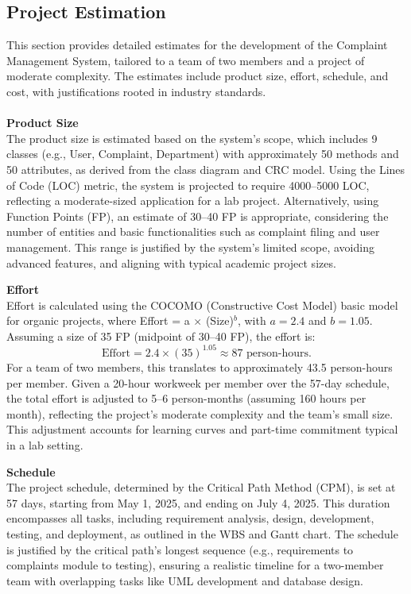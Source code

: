 \documentclass[a4paper,12pt]{article}
\begin{document}
\subsection{Project Estimation}
This section provides detailed estimates for the development of the Complaint Management System, tailored to a team of two members and a project of moderate complexity. The estimates include product size, effort, schedule, and cost, with justifications rooted in industry standards.
\\ \\ 
\textbf{Product Size} \\
The product size is estimated based on the system's scope, which includes 9 classes (e.g., User, Complaint, Department) with approximately 50 methods and 50 attributes, as derived from the class diagram and CRC model. Using the Lines of Code (LOC) metric, the system is projected to require 4000–5000 LOC, reflecting a moderate-sized application for a lab project. Alternatively, using Function Points (FP), an estimate of 30–40 FP is appropriate, considering the number of entities and basic functionalities such as complaint filing and user management. This range is justified by the system's limited scope, avoiding advanced features, and aligning with typical academic project sizes.

\textbf{Effort}\\
Effort is calculated using the COCOMO (Constructive Cost Model) basic model for organic projects, where Effort = a $\times$ (Size)$^b$, with $a = 2.4$ and $b = 1.05$. Assuming a size of 35 FP (midpoint of 30–40 FP), the effort is:
\[
\text{Effort} = 2.4 \times (35)^{1.05} \approx 87 \text{ person-hours}.
\]
For a team of two members, this translates to approximately 43.5 person-hours per member. Given a 20-hour workweek per member over the 57-day schedule, the total effort is adjusted to 5–6 person-months (assuming 160 hours per month), reflecting the project's moderate complexity and the team's small size. This adjustment accounts for learning curves and part-time commitment typical in a lab setting.

\textbf{Schedule}\\
The project schedule, determined by the Critical Path Method (CPM), is set at 57 days, starting from May 1, 2025, and ending on July 4, 2025. This duration encompasses all tasks, including requirement analysis, design, development, testing, and deployment, as outlined in the WBS and Gantt chart. The schedule is justified by the critical path's longest sequence (e.g., requirements to complaints module to testing), ensuring a realistic timeline for a two-member team with overlapping tasks like UML development and database design.
\end{document}
